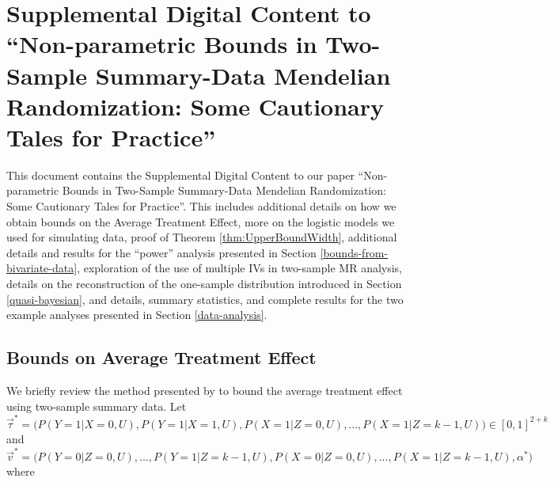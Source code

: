 \documentclass[
]{article}
\theoremstyle{plain}
\begin{document}
\newpage

\printbibliography

\newpage

\setcounter{page}{1}

\setcounter{table}{0}
\setcounter{figure}{0}

\renewcommand{\tablename}{eTable}
\renewcommand{\figurename}{eFigure}

\hypertarget{appendix-appendix}{%
\appendix}


\hypertarget{supplemental-digital-content-to-non-parametric-bounds-in-two-sample-summary-data-mendelian-randomization-some-cautionary-tales-for-practice}{%
\section{Supplemental Digital Content to ``Non-parametric Bounds in Two-Sample Summary-Data Mendelian Randomization: Some Cautionary Tales for Practice''}\label{supplemental-digital-content-to-non-parametric-bounds-in-two-sample-summary-data-mendelian-randomization-some-cautionary-tales-for-practice}}

This document contains the Supplemental Digital Content to our paper ``Non-parametric Bounds in Two-Sample Summary-Data Mendelian Randomization: Some Cautionary Tales for Practice''. This includes additional details on how we obtain bounds on the Average Treatment Effect, more on the logistic models we used for simulating data, proof of Theorem \ref{thm:UpperBoundWidth}, additional details and results for the ``power'' analysis presented in Section \ref{bounds-from-bivariate-data}, exploration of the use of multiple IVs in two-sample MR analysis, details on the reconstruction of the one-sample distribution introduced in Section \ref{quasi-bayesian}, and details, summary statistics, and complete results for the two example analyses presented in Section \ref{data-analysis}.

\hypertarget{bounds-on-average-treatment-effect}{%
\subsection{Bounds on Average Treatment Effect}\label{bounds-on-average-treatment-effect}}

We briefly review the method presented by \textcite{ramsahai_causal_2012} to bound the average treatment effect using two-sample summary data. Let \(\vec{\tau}^* = \Big(P(Y = 1 | X = 0, U), P(Y = 1 | X = 1, U), P(X = 1 | Z = 0, U), ..., P(X = 1 | Z = k-1, U)\Big) \in [0,1]^{2+k}\) and \(\vec{v}^* = \Big(P(Y = 0 | Z = 0, U), ..., P(Y = 1 | Z = k-1, U), P(X = 0 | Z = 0, U), ..., P(X = 1 | Z = k-1, U), \alpha^*\Big)\) where
\end{document}
